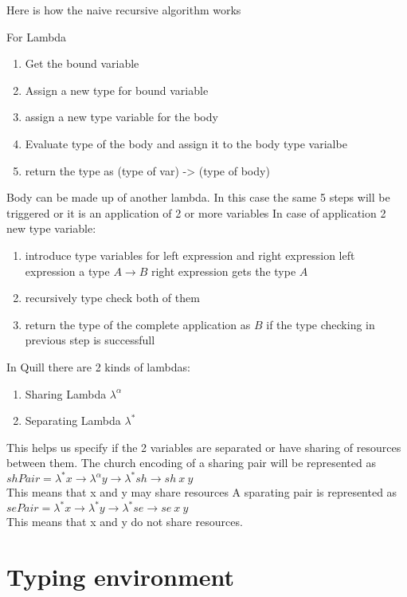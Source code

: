 Here is how the naive recursive algorithm works

For Lambda
\begin{enumerate}
\item Get the bound variable
\item Assign a new type for bound variable
\item assign a new type variable for the body
\item Evaluate type of the body and assign it to the body type varialbe
\item return the type as (type of var) -> (type of body)
\end{enumerate}

Body can be made up of another lambda. In this case the same 5 steps will be triggered
or it is an application of 2 or more variables
In case of application 2 new type variable:
\begin{enumerate}
\item introduce type variables for left expression and right expression
    left expression a type $A \rightarrow B$ right expression gets the type $A$
\item recursively type check both of them
\item return the type of the complete application as $B$ if the type checking in previous step is successfull
\end{enumerate}


In Quill there are 2 kinds of lambdas:
\begin{enumerate}
\item Sharing Lambda $\lambda^{\alpha}$
\item Separating Lambda $\lambda^{*}$
\end{enumerate}
This helps us specify if the 2 variables are separated or have sharing
of resources between them.
The church encoding of a sharing pair will be represented as\\
$shPair = \lambda^{*} x \rightarrow \lambda^{\alpha} y \rightarrow \lambda^{*} sh \rightarrow sh\ x\ y$\\
This means that x and y may share resources
A sparating pair is represented as\\
$sePair = \lambda^{*} x \rightarrow \lambda^{*}y \rightarrow \lambda^{*}se \rightarrow se\ x\ y$\\
This means that x and y do not share resources.

\section{Typing environment}

